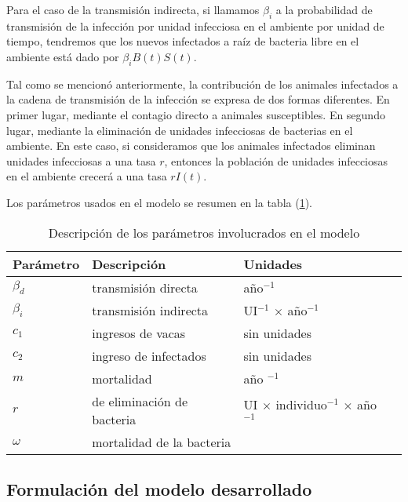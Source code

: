 \documentclass[12pt,preprint,times]{elsarticle}
\begin{document}
Para el caso de la transmisión indirecta, si llamamos $\beta_i$ a la probabilidad de transmisión de la infección por unidad infecciosa en el ambiente por unidad de tiempo, tendremos que los nuevos infectados a raíz de bacteria libre en el ambiente está dado por $\beta_i B(t) S(t)$.

Tal como se mencionó anteriormente, la contribución de los animales infectados a la cadena de transmisión de la infección se expresa de dos formas diferentes. En primer lugar, mediante el contagio directo a animales susceptibles. En segundo lugar, mediante la eliminación de unidades infecciosas de bacterias en el ambiente. En este caso, si consideramos que los animales infectados eliminan unidades infecciosas a una tasa $r$, entonces la población de unidades infecciosas en el ambiente crecerá a una tasa $rI(t)$.  

Los parámetros usados en el modelo se resumen en la tabla (\ref{tab:descripcion_parametros}).
\begin{table}[H]
\centering
\renewcommand{\arraystretch}{1.3}%
\begin{tabular}{l l l l } 
\toprule
\multicolumn{1}{l}{\textbf{Parámetro}} 
 & \multicolumn{1}{l}{\textbf{Descripción }} & \multicolumn{1}{l}{\textbf{Unidades}}\\
  
\midrule
$\beta_d$ & transmisión  directa & año$^{-1}$\\
$\beta_i$ &transmisión indirecta& UI$^{-1}$ $\times$ año$^{-1}$ \\
$c_1$     & ingresos de vacas & sin unidades\\
$c_2$     & ingreso de infectados & sin unidades\\
$m$         & mortalidad & año $^{-1}$ \\
$r$         & de eliminación de bacteria & UI $\times$ individuo$^{-1}$ $\times$ año$^{-1}$ \\
$\omega$  & mortalidad de la bacteria  \\

\bottomrule
\end{tabular}
\caption{Descripción de los parámetros involucrados en el modelo }
\label{tab:descripcion_parametros}
\end{table}

\subsection{Formulación del modelo desarrollado}\label{sec: Formulacion_del_modelo}
\end{document}
